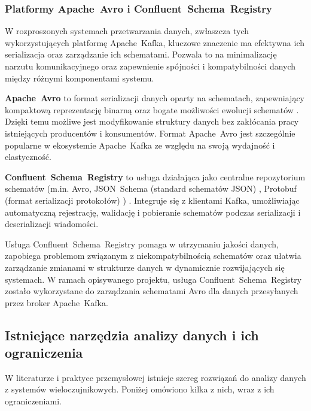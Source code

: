 \subsubsection{Platformy \mbox{Apache Avro} i \mbox{Confluent Schema Registry}}
\label{subsubsec:avro_schema_registry}

W rozproszonych systemach przetwarzania danych, zwłaszcza tych wykorzystujących platformę \mbox{Apache Kafka}, kluczowe znaczenie ma efektywna ich serializacja oraz zarządzanie ich schematami. Pozwala to na minimalizację narzutu komunikacyjnego oraz zapewnienie spójności i kompatybilności danych między różnymi komponentami systemu.

\textbf{\mbox{Apache Avro}} to format serializacji danych oparty na schematach, zapewniający kompaktową reprezentację binarną oraz bogate możliwości ewolucji schematów \cite{avro_documentation}. Dzięki temu możliwe jest modyfikowanie struktury danych bez zakłócania pracy istniejących producentów i konsumentów. Format \mbox{Apache Avro} jest szczególnie popularne w ekosystemie \mbox{Apache Kafka} ze względu na swoją wydajność i elastyczność.

\textbf{\mbox{Confluent Schema Registry}} to usługa działająca jako centralne repozytorium schematów (m.in. Avro, \mbox{JSON Schema} (standard schematów JSON) \cite{json_schema_spec}, \mbox{Protobuf} (format serializacji protokołów) \cite{protobuf_docs}) \cite{confluent_schema_registry}. Integruje się z klientami Kafka, umożliwiając automatyczną rejestrację, walidację i pobieranie schematów podczas serializacji i deserializacji wiadomości. 

Usługa \mbox{Confluent Schema Registry} pomaga w utrzymaniu jakości danych, zapobiega problemom związanym z niekompatybilnością schematów oraz ułatwia zarządzanie zmianami w strukturze danych w dynamicznie rozwijających się systemach. W ramach opisywanego projektu, usługa \mbox{Confluent Schema Registry} zostało wykorzystane do zarządzania schematami Avro dla danych przesyłanych przez broker \mbox{Apache Kafka}.

\subsection{Istniejące narzędzia analizy danych i ich ograniczenia}
\label{subsec:istniejace_rozwiazania}

W literaturze i praktyce przemysłowej istnieje szereg rozwiązań do analizy danych z systemów wieloczujnikowych. Poniżej omówiono kilka z nich, wraz z ich ograniczeniami.

